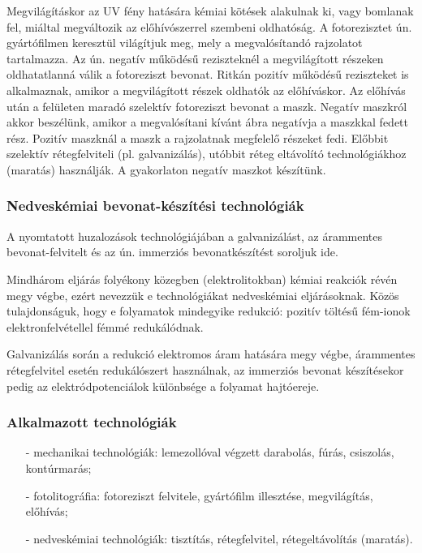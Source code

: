 \documentclass[12pt]{article}
\begin{document}
		Megvilágításkor az UV fény hatására kémiai kötések alakulnak ki, vagy bomlanak fel, miáltal megváltozik az előhívószerrel szembeni oldhatóság. A fotorezisztet ún. gyártófilmen keresztül világítjuk meg, mely a megvalósítandó rajzolatot tartalmazza. Az ún. negatív működésű reziszteknél a megvilágított részeken oldhatatlanná válik a fotoreziszt bevonat. Ritkán pozitív működésű reziszteket is alkalmaznak, amikor a megvilágított részek oldhatók az előhíváskor. Az előhívás után a felületen maradó szelektív fotoreziszt bevonat a maszk. Negatív maszkról akkor beszélünk, amikor a megvalósítani kívánt ábra negatívja a maszkkal fedett rész. Pozitív maszknál a maszk a rajzolatnak megfelelő részeket fedi. Előbbit szelektív rétegfelviteli (pl. galvanizálás), utóbbit réteg eltávolító technológiákhoz (maratás) használják. A gyakorlaton negatív maszkot készítünk.
		
		\subsubsection{Nedveskémiai bevonat-készítési technológiák} A nyomtatott huzalozások technológiájában a galvanizálást, az árammentes bevonat-felvitelt és az ún. immerziós bevonatkészítést soroljuk ide.

		Mindhárom eljárás folyékony közegben (elektrolitokban) kémiai reakciók révén megy végbe, ezért nevezzük e technológiákat nedveskémiai eljárásoknak. Közös tulajdonságuk, hogy e folyamatok mindegyike redukció: pozitív töltésű fém-ionok elektronfelvétellel fémmé redukálódnak.
		
		Galvanizálás során a redukció elektromos áram hatására megy végbe, árammentes rétegfelvitel esetén redukálószert használnak, az immerziós bevonat készítésekor pedig az elektródpotenciálok különbsége a folyamat hajtóereje.

		\subsubsection{Alkalmazott technológiák}
		\begin{itemize}
			\item[-] mechanikai technológiák: lemezollóval végzett darabolás, fúrás, csiszolás, kontúrmarás;
			\item[-] fotolitográfia: fotoreziszt felvitele, gyártófilm illesztése, megvilágítás, előhívás;
			\item[-] nedveskémiai technológiák: tisztítás, rétegfelvitel, rétegeltávolítás (maratás).
		\end{itemize}
			
\end{document}
